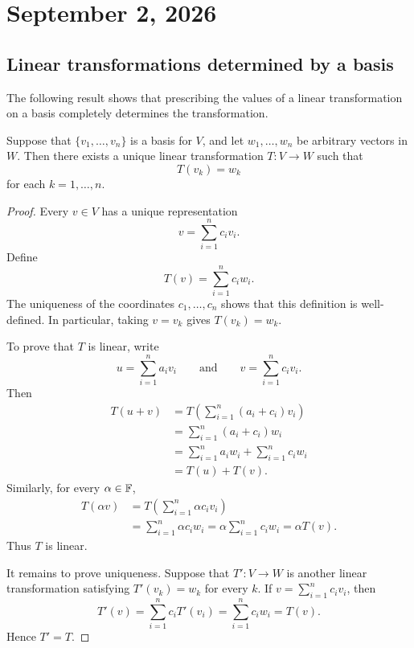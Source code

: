 \section{September 2, 2026}

\subsection{Linear transformations determined by a basis}

The following result shows that prescribing the values of a linear
transformation on a basis completely determines the transformation.

\begin{lemma}\label{lem:linear-map}
  Suppose that $\{v_1,\ldots,v_n\}$ is a basis for $V$, and let
  $w_1,\ldots,w_n$ be arbitrary vectors in $W$. Then there exists a
  unique linear transformation $T\colon V\to W$ such that
  \[
    T(v_k)=w_k
  \]
  for each $k=1,\ldots,n$.
\end{lemma}

\begin{proof}
  Every $v\in V$ has a unique representation
  \[
    v=\sum_{i=1}^n c_iv_i.
  \]
  Define
  \[
    T(v)=\sum_{i=1}^n c_iw_i.
  \]
  The uniqueness of the coordinates $c_1,\ldots,c_n$ shows that this
  definition is well-defined. In particular, taking $v=v_k$ gives
  $T(v_k)=w_k$.

  To prove that $T$ is linear, write
  \[
    u=\sum_{i=1}^n a_iv_i
    \qquad\text{and}\qquad
    v=\sum_{i=1}^n c_iv_i.
  \]
  Then
  \begin{align*}
    T(u+v)
    &=T\left(\sum_{i=1}^n(a_i+c_i)v_i\right) \\
    &=\sum_{i=1}^n(a_i+c_i)w_i \\
    &=\sum_{i=1}^n a_iw_i+\sum_{i=1}^n c_iw_i \\
    &=T(u)+T(v).
  \end{align*}
  Similarly, for every $\alpha\in\mathbb{F}$,
  \begin{align*}
    T(\alpha v)
    &=T\left(\sum_{i=1}^n\alpha c_iv_i\right) \\
    &=\sum_{i=1}^n\alpha c_iw_i
      =\alpha\sum_{i=1}^n c_iw_i
      =\alpha T(v).
  \end{align*}
  Thus $T$ is linear.

  It remains to prove uniqueness. Suppose that $T'\colon V\to W$ is
  another linear transformation satisfying $T'(v_k)=w_k$ for every
  $k$. If $v=\sum_{i=1}^n c_iv_i$, then
  \[
    T'(v)
    =\sum_{i=1}^n c_iT'(v_i)
    =\sum_{i=1}^n c_iw_i
    =T(v).
  \]
  Hence $T'=T$.
\end{proof}

